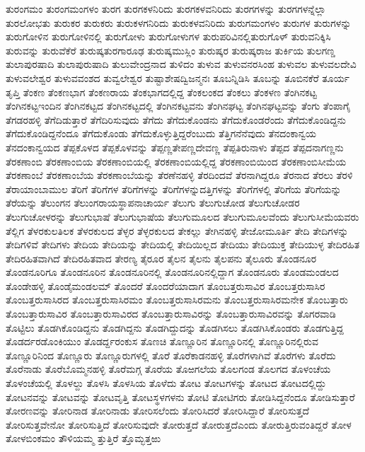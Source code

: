 {ತುರಂಗಮಂ
ತುರಂಗಮಂಗಳಂ
ತುರಗ
ತುರಗಕಳನಿರಿದು
ತುರಗಕಳವನಿರಿದು
ತುರಗಗಳನ್ನು
ತುರಗಗಳನ್ನೆಲ್ಲಾ
ತುರಲೋಭತು
ತುರುಕರ
ತುರುಕರು
ತುರುಕಳಗನಿರಿದು
ತುರುಕಳವನಿರಿದು
ತುರುಗಮಂಗಳಂ
ತುರುಗಳ
ತುರುಗಳನ್ನು
ತುರುಗೋಳಿನ
ತುರುಗೋಳಿನಲ್ಲಿ
ತುರುಗೋಳು
ತುರುಗೋಳುಗಳ
ತುರುಪರಿವಿನಲ್ಲಿತುರುಗೊಳ್
ತುರುವನಿಕ್ಕಿಸಿ
ತುರುವನ್ನು
ತುರುವೆಕೆರೆ
ತುರುಷ್ಕತುರಗಾರೂಢ
ತುರುಷ್ಕಮುಸ್ಲಿಂ
ತುರುಷ್ಕರ
ತುರುಷ್ಕರಾಜ
ತುರ್ಕಿಯ
ತುಲಗಣ್ಡ
ತುಲಾಪುರಷಾದಿ
ತುಲಾಪುರುಷಾದಿ
ತುಲುವೇಂದ್ರನಾದ
ತುಳಿದಂ
ತುಳುವ
ತುಳುವನರಸಿಂಹ
ತುಳುವಲ
ತುಳುವಲದೇವಿ
ತುಳುವಲೇಶ್ವರ
ತುಳುವವಂಶದ
ತುವ್ವಲೇಶ್ವರ
ತುಷ್ಟಾಶೇಷದ್ವಿಜನ್ಮನಃ
ತೂಬನ್ನಿಡಿಸಿ
ತೂಬನ್ನು
ತೂಬಿನಕೆರೆ
ತೂರ್ಯ
ತೃಪ್ತಿ
ತೆಂಕಣ
ತೆಂಕಣಭಾಗ
ತೆಂಕಣರಾಯ
ತೆಂಕಭಾಗದಲ್ಲಿದ್ದ
ತೆಂಕಲಂಕದ
ತೆಂಕಲು
ತೆಂಕಳಣ
ತೆಂಗಿನಕಟ್ಟ
ತೆಂಗಿನಕಟ್ಟಇಂದಿನ
ತೆಂಗಿನಕಟ್ಟದ
ತೆಂಗಿನಕಟ್ಟದಲ್ಲಿ
ತೆಂಗಿನಕಟ್ಟವನು
ತೆಂಗಿನಘಟ್ಟ
ತೆಂಗಿನಘಟ್ಟವನ್ನು
ತೆಂಗು
ತೆಂಪಾಗೈ
ತೆಗಡರಹಳ್ಳಿ
ತೆಗೆದಿಡುತ್ತಾರೆ
ತೆಗೆದಿರಿಸುವುದು
ತೆಗೆದು
ತೆಗೆದುಕೊಂಡನು
ತೆಗೆದುಕೊಂಡರೆಂದು
ತೆಗೆದುಕೊಂಡಿದ್ದನು
ತೆಗೆದುಕೊಂಡಿದ್ದನೆಂದೂ
ತೆಗೆದುಕೊಂಡು
ತೆಗೆದುಕೊಳ್ಳುತ್ತಿದ್ದರೆಂಬುದು
ತೆತ್ತಿಗನೆನೆವುದು
ತೆನದಂಕಾನ್ವಯ
ತೆನದಂಕಾನ್ವಯದ
ತೆಪ್ಪಕೊಳದ
ತೆಪ್ಪಕೊಳವನ್ನು
ತೆಪ್ಪಣ್ಣತೇಪಣ್ಣದೇವಣ್ಣ
ತೆಪ್ಪತಿರುನಾಳು
ತೆಪ್ಪದ
ತೆಪ್ಪದನಾಗಣ್ಣನು
ತೆರಕಣಾಂಬಿ
ತೆರಕಣಾಂಬಿಯ
ತೆರಕಣಾಂಬಿಯಲ್ಲಿ
ತೆರಕಣಾಂಬಿಯಲ್ಲಿದ್ದ
ತೆರಕಣಾಂಬಿಯಿಂದ
ತೆರಕಣಾಂಬಿಸೀಮೆಯ
ತೆರಕಣಾಂಬೆ
ತೆರಕಣಾಂಬೆಯ
ತೆರಕಣಾಂಬೆಯನ್ನು
ತೆರಣೆನಹಳ್ಳಿ
ತೆರದಿಂದವೆ
ತೆರನಾಗಿದ್ದರೂ
ತೆರನಾದ
ತೆರಲು
ತೆರಳಿ
ತೆರಾಯಾಂಬಾಮುಲ
ತೆರಿಗೆ
ತೆರಿಗೆಗಳ
ತೆರಿಗೆಗಳನ್ನು
ತೆರಿಗೆಗಳನ್ನುದತ್ತಿಗಳನ್ನು
ತೆರಿಗೆಗಳಲ್ಲಿ
ತೆರಿಗೆಯ
ತೆರಿಗೆಯನ್ನು
ತೆರೆಯನ್ನು
ತೆಲುಂಗನ
ತೆಲುಂಗರಾಯಸ್ಥಾಪನಾಚಾರ್ಯ
ತೆಲುಗು
ತೆಲುಗುಚೋಡ
ತೆಲುಗುಚೋಡರ
ತೆಲುಗುಚೋಳರನ್ನು
ತೆಲುಗುಭಾಷೆ
ತೆಲುಗುಭಾಷೆಯ
ತೆಲುಗುಮೂಲದ
ತೆಲುಗುಮೂಲವೆಂದು
ತೆಲುಗುಸೀಮೆಯವರು
ತೆಲ್ಲಿಗ
ತೆಳರಕುಲತಿಲಕ
ತೆಳರಕುಲದ
ತೆಳ್ಳರ
ತೆಳ್ಳರಕುಲದ
ತೇಕಲ್ಲು
ತೇಗಿನಹಳ್ಳಿ
ತೇಜೋಮೂರ್ತಿ
ತೇದಿ
ತೇದಿಗಳನ್ನು
ತೇದಿಗಳಿವೆ
ತೇದಿಗಳು
ತೇದಿಯ
ತೇದಿಯನ್ನು
ತೇದಿಯಲ್ಲಿ
ತೇದಿಯಿಲ್ಲದ
ತೇದಿಯು
ತೇದಿಯುಕ್ತ
ತೇದಿಯುಳ್ಳ
ತೇದಿರಹಿತ
ತೇದಿರಹಿತವಾಗಿದೆ
ತೇದಿರಹಿತವಾದ
ತೇರಣ್ಯ
ತೈರೂರ
ತೈಲನ
ತೈಲನು
ತೈಲಪನು
ತೈಲೂರು
ತೊಂಡನೂರ
ತೊಂಡನೂರಿಗೂ
ತೊಂಡನೂರಿನ
ತೊಂಡನೂರಿನಲ್ಲಿ
ತೊಂಡನೂರಿನಲ್ಲಿದ್ದಾಗ
ತೊಂಡನೂರು
ತೊಂಡಮಂಡಲದ
ತೊಂಡೇಹಳ್ಳಿ
ತೊಂಡೈಮಂಡಲಮ್
ತೊಂದರೆ
ತೊಂದರೆಯಾದಾಗ
ತೊಂಬತ್ತರುಸಾವಿರ
ತೊಂಬತ್ತರುಸಾಸಿರ
ತೊಂಬತ್ತರುಸಾಸಿರದ
ತೊಂಬತ್ತರುಸಾಸಿರಮಂ
ತೊಂಬತ್ತರುಸಾಸಿರಮನು
ತೊಂಬತ್ತರುಸಾಸಿರಮನೇಕ
ತೊಂಬತ್ತಾರು
ತೊಂಬತ್ತಾರುಸಾವಿರ
ತೊಂಬತ್ತಾರುಸಾವಿರದ
ತೊಂಬತ್ತಾರುಸಾವಿರನ್ನು
ತೊಂಬತ್ತಾರುಸಾವಿರವನ್ನು
ತೊಗರವಾಡಿ
ತೊಟ್ಟಿಲು
ತೊಡಗಿಕೊಂಡಿದ್ದನು
ತೊಡಗಿದ್ದನು
ತೊಡಗಿದ್ದುದನ್ನು
ತೊಡಗಿಸಲು
ತೊಡಗಿಸಿಕೊಂಡರು
ತೊಡಗುತ್ತಿದ್ದ
ತೊಡರ್ದರಡೊಂಕಿಯುಂ
ತೊಡರ್ದ್ದರಂಕುಸ
ತೊಣಚಿ
ತೊಣ್ಣೂರಿನ
ತೊಣ್ಣೂರಿನಲ್ಲಿ
ತೊಣ್ಣೂರಿನಲ್ಲಿರುವ
ತೊಣ್ಣೂರಿನಿಂದ
ತೊಣ್ಣೂರು
ತೊಣ್ಣೂರುಗಳಲ್ಲಿ
ತೊರೆ
ತೊರೆಕಾಡನಹಳ್ಳಿ
ತೊರೆಗಳಾಗಿವೆ
ತೊರೆಗಳು
ತೊರೆದು
ತೊರೆನಾಡು
ತೊರೆಬೊಮ್ಮನಹಳ್ಳಿ
ತೊರೆಮಗ್ಗ
ತೊರೆಯ
ತೊಱಗಲೆಯ
ತೊಲಗಂಡ
ತೊಲಗದ
ತೊಳಂಚೆಯ
ತೊಳಂಚೆಯಲ್ಲಿ
ತೊಳಲ್ದು
ತೊಳಸಿ
ತೊಳಸಿಯ
ತೊಳೆದು
ತೋಟ
ತೋಟಗಳನ್ನು
ತೋಟದ
ತೋಟದಲ್ಲಿದ್ದು
ತೋಟನವನ್ನು
ತೋಟವನ್ನು
ತೋಟವೃತ್ತಿ
ತೋಟಸ್ಥಳಗಳನು
ತೋಟಿ
ತೋಟಿಗರು
ತೋಡಿಸಿದ್ದನೆಂದೂ
ತೋಡಿಸುತ್ತಾರೆ
ತೋರಣವನ್ನು
ತೋರಿನಾಡ
ತೋರಿನಾಡು
ತೋರಿಸಲೆಂದು
ತೋರಿಸಿದರೆ
ತೋರಿಸಿದ್ದಾರೆ
ತೋರಿಸುತ್ತದೆ
ತೋರಿಸುತ್ತವೇನೋ
ತೋರಿಸುತ್ತಿದೆ
ತೋರಿಸುವುದೇ
ತೋರುತ್ತದೆ
ತೋರುತ್ತದೆಎಂದು
ತೋರುತ್ತಿರುವಂತಿದ್ದರೆ
ತೋಳ
ತೋಳಬಿಂಕಮಂ
ತೌಳಿಯಮ್ಮ
ತ್ತುತ್ತಿರೆ
ತ್ತೊಮ್ಭತ್ತಱು
}
